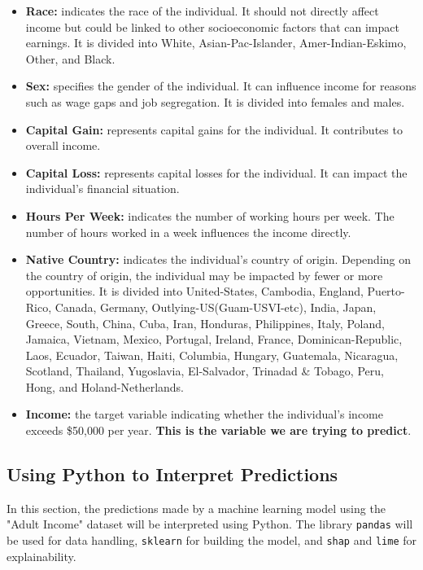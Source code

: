 \documentclass[10pt,journal,compsoc]{IEEEtran}
\begin{document}
\begin{itemize}
    \item \textbf{Race:} indicates the race of the individual. It should not directly affect income but could be linked to other socioeconomic factors that can impact earnings. It is divided into White, Asian-Pac-Islander, Amer-Indian-Eskimo, Other, and Black.

    \item \textbf{Sex:} specifies the gender of the individual. It can influence income for reasons such as wage gaps and job segregation. It is divided into females and males.

    \item \textbf{Capital Gain:} represents capital gains for the individual. It contributes to overall income.

    \item \textbf{Capital Loss:} represents capital losses for the individual. It can impact the individual's financial situation.

    \item \textbf{Hours Per Week:} indicates the number of working hours per week. The number of hours worked in a week influences the income directly.

    \item \textbf{Native Country:} indicates the individual's country of origin. Depending on the country of origin, the individual may be impacted by fewer or more opportunities. It is divided into United-States, Cambodia, England, Puerto-Rico, Canada, Germany, Outlying-US(Guam-USVI-etc), India, Japan, Greece, South, China, Cuba, Iran, Honduras, Philippines, Italy, Poland, Jamaica, Vietnam, Mexico, Portugal, Ireland, France, Dominican-Republic, Laos, Ecuador, Taiwan, Haiti, Columbia, Hungary, Guatemala, Nicaragua, Scotland, Thailand, Yugoslavia, El-Salvador, Trinadad \& Tobago, Peru, Hong, and Holand-Netherlands.

    \item \textbf{Income:} the target variable indicating whether the individual's income exceeds  \$50,000 per year. \textbf{This is the variable we are trying to predict}.

\end{itemize}

\subsection{Using Python to Interpret Predictions}
In this section, the predictions made by a machine learning model using the "Adult Income" dataset will be interpreted using Python. The library \texttt{pandas} will be used for data handling, \texttt{sklearn} for building the model, and \texttt{shap} and \texttt{lime} for explainability.
\end{document}
